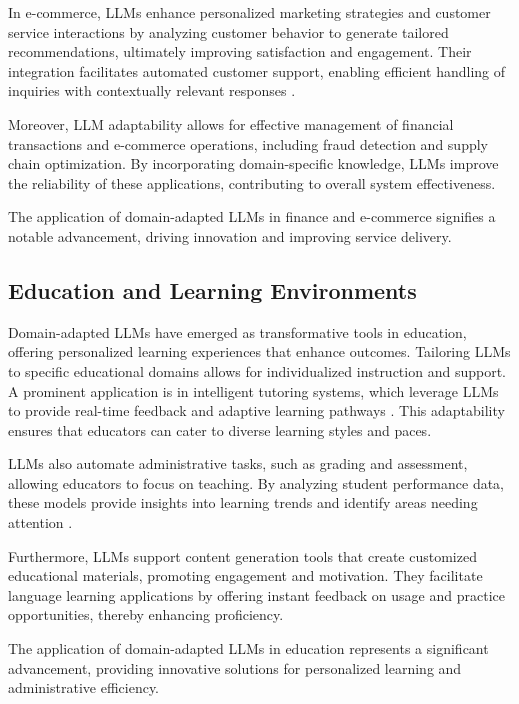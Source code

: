 In e-commerce, LLMs enhance personalized marketing strategies and customer service interactions by analyzing customer behavior to generate tailored recommendations, ultimately improving satisfaction and engagement. Their integration facilitates automated customer support, enabling efficient handling of inquiries with contextually relevant responses \cite{li2023ecomgptinstructiontuninglargelanguage}.

Moreover, LLM adaptability allows for effective management of financial transactions and e-commerce operations, including fraud detection and supply chain optimization. By incorporating domain-specific knowledge, LLMs improve the reliability of these applications, contributing to overall system effectiveness. 

The application of domain-adapted LLMs in finance and e-commerce signifies a notable advancement, driving innovation and improving service delivery.

\subsection{Education and Learning Environments} \label{subsec:Education and Learning Environments}

Domain-adapted LLMs have emerged as transformative tools in education, offering personalized learning experiences that enhance outcomes. Tailoring LLMs to specific educational domains allows for individualized instruction and support. A prominent application is in intelligent tutoring systems, which leverage LLMs to provide real-time feedback and adaptive learning pathways \cite{kasneci2023chatgpt}. This adaptability ensures that educators can cater to diverse learning styles and paces.

LLMs also automate administrative tasks, such as grading and assessment, allowing educators to focus on teaching. By analyzing student performance data, these models provide insights into learning trends and identify areas needing attention \cite{kasneci2023chatgpt}. 

Furthermore, LLMs support content generation tools that create customized educational materials, promoting engagement and motivation. They facilitate language learning applications by offering instant feedback on usage and practice opportunities, thereby enhancing proficiency.

The application of domain-adapted LLMs in education represents a significant advancement, providing innovative solutions for personalized learning and administrative efficiency.

